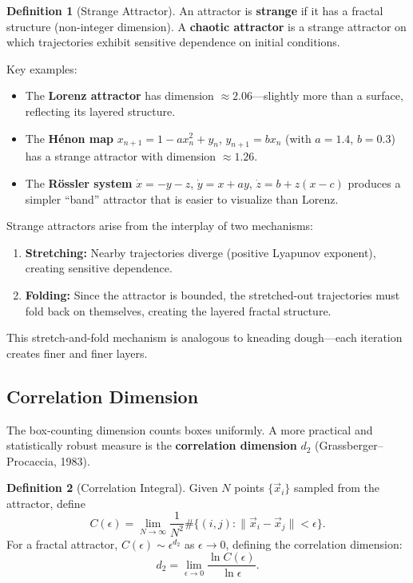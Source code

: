 \documentclass[11pt,letterpaper]{article}
\theoremstyle{definition}
\newtheorem{definition}{Definition}[section]
\theoremstyle{plain}
\theoremstyle{remark}
\begin{document}
\begin{definition}[Strange Attractor]
An attractor is \textbf{strange} if it has a fractal structure (non-integer
dimension).  A \textbf{chaotic attractor} is a strange attractor on which
trajectories exhibit sensitive dependence on initial conditions.
\end{definition}

Key examples:
\begin{itemize}[leftmargin=2em]
\item The \textbf{Lorenz attractor} has dimension $\approx 2.06$---slightly
      more than a surface, reflecting its layered structure.
\item The \textbf{H\'enon map} $x_{n+1} = 1 - ax_n^2 + y_n$,
      $y_{n+1} = bx_n$ (with $a=1.4$, $b=0.3$) has a strange attractor
      with dimension $\approx 1.26$.
\item The \textbf{R\"ossler system}
      $\dot{x} = -y-z$, $\dot{y} = x+ay$, $\dot{z} = b+z(x-c)$ produces
      a simpler ``band'' attractor that is easier to visualize than Lorenz.
\end{itemize}

\begin{physicalnote}
Strange attractors arise from the interplay of two mechanisms:
\begin{enumerate}[leftmargin=2em]
\item \textbf{Stretching:} Nearby trajectories diverge (positive Lyapunov
      exponent), creating sensitive dependence.
\item \textbf{Folding:} Since the attractor is bounded, the stretched-out
      trajectories must fold back on themselves, creating the layered
      fractal structure.
\end{enumerate}
This stretch-and-fold mechanism is analogous to kneading dough---each
iteration creates finer and finer layers.
\end{physicalnote}

\subsection{Correlation Dimension}

The box-counting dimension counts boxes uniformly.  A more practical
and statistically robust measure is the \textbf{correlation dimension}
$d_2$ (Grassberger--Procaccia, 1983).

\begin{definition}[Correlation Integral]
Given $N$ points $\{\vec{x}_i\}$ sampled from the attractor, define
\begin{equation}
  C(\epsilon) = \lim_{N\to\infty}\frac{1}{N^2}\#\{(i,j):\|\vec{x}_i
  - \vec{x}_j\| < \epsilon\}.
\end{equation}
For a fractal attractor, $C(\epsilon) \sim \epsilon^{d_2}$ as
$\epsilon\to 0$, defining the correlation dimension:
\begin{equation}
  d_2 = \lim_{\epsilon\to 0}\frac{\ln C(\epsilon)}{\ln\epsilon}.
\end{equation}
\end{definition}
\end{document}
